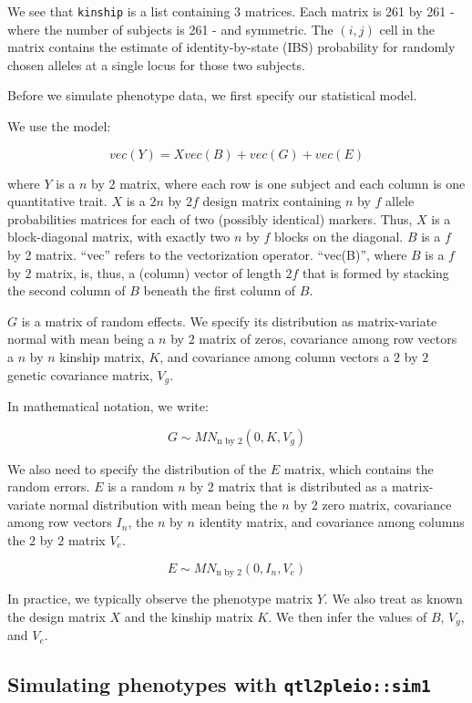 \documentclass[oneside]{book}
\begin{document}
We see that \texttt{kinship} is a list containing 3 matrices. Each
matrix is 261 by 261 - where the number of subjects is 261 - and
symmetric. The \((i, j)\) cell in the matrix contains the estimate of
identity-by-state (IBS) probability for randomly chosen alleles at a
single locus for those two subjects.

Before we simulate phenotype data, we first specify our statistical
model.

We use the model:

\[vec(Y) = X vec(B) + vec(G) + vec(E)\]

where \(Y\) is a \(n\) by \(2\) matrix, where each row is one subject
and each column is one quantitative trait. \(X\) is a \(2n\) by \(2f\)
design matrix containing \(n\) by \(f\) allele probabilities matrices
for each of two (possibly identical) markers. Thus, \(X\) is a
block-diagonal matrix, with exactly two \(n\) by \(f\) blocks on the
diagonal. \(B\) is a \(f\) by 2 matrix. ``vec'' refers to the
vectorization operator. ``vec(B)'', where \(B\) is a \(f\) by \(2\)
matrix, is, thus, a (column) vector of length \(2f\) that is formed by
stacking the second column of \(B\) beneath the first column of \(B\).

\(G\) is a matrix of random effects. We specify its distribution as
matrix-variate normal with mean being a \(n\) by \(2\) matrix of zeros,
covariance among row vectors a \(n\) by \(n\) kinship matrix, \(K\), and
covariance among column vectors a \(2\) by \(2\) genetic covariance
matrix, \(V_g\).

In mathematical notation, we write:

\[G \sim MN_{\text{n by 2}}(0, K, V_g)\]

We also need to specify the distribution of the \(E\) matrix, which
contains the random errors. \(E\) is a random \(n\) by \(2\) matrix that
is distributed as a matrix-variate normal distribution with mean being
the \(n\) by \(2\) zero matrix, covariance among row vectors \(I_n\),
the \(n\) by \(n\) identity matrix, and covariance among columns the
\(2\) by \(2\) matrix \(V_e\).

\[E \sim MN_{\text{n by 2}}(0, I_n, V_e)\]

In practice, we typically observe the phenotype matrix \(Y\). We also
treat as known the design matrix \(X\) and the kinship matrix \(K\). We
then infer the values of \(B\), \(V_g\), and \(V_e\).

\hypertarget{simulating-phenotypes-with-qtl2pleiosim1}{%
\subsection{\texorpdfstring{Simulating phenotypes with
\texttt{qtl2pleio::sim1}}{Simulating phenotypes with qtl2pleio::sim1}}\label{simulating-phenotypes-with-qtl2pleiosim1}}
\end{document}
